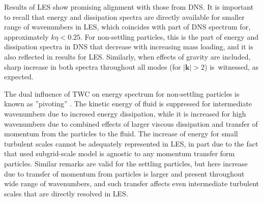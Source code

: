 \documentclass{pracamgren}
\begin{document}
Results of LES show promising alignment with those from DNS.
It is important to recall that energy and dissipation spectra are directly available for smaller range of wavenumbers in LES, which coincides with part of DNS spectrum for, approximately $k \eta < 0.25$.
For non-settling particles, this is the part of energy and dissipation spectra in DNS that decrease with increasing mass loading, and it is also reflected in results for LES.
Similarly, when effects of gravity are included, sharp increase in both spectra throughout all modes (for $|\mathbf{k}| > 2$) is~witnessed, as expected.

The dual influence of TWC on energy spectrum for non-settling particles is known as ''pivoting'' \parencite{Squires1990,Bosse2006,Rosa2020}.
The kinetic energy of fluid is suppressed for intermediate wavenumbers due to incresed energy dissipation, while it is increased for high wavenumbers due to combined effects of larger viscous dissipation and transfer of momentum from the particles to the fluid.
The increase of energy for small turbulent scales cannot be adequately represented in LES, in part due to the fact that used subgrid-scale model is agnostic to any momentum transfer form particles. 
Similar remarks are valid for the settling particles, but here increase due to transfer of momentum from particles is larger and present throughout wide range of wavenumbers, and such transfer affects even intermediate turbulent scales that are directly resolved in LES.
\end{document}
